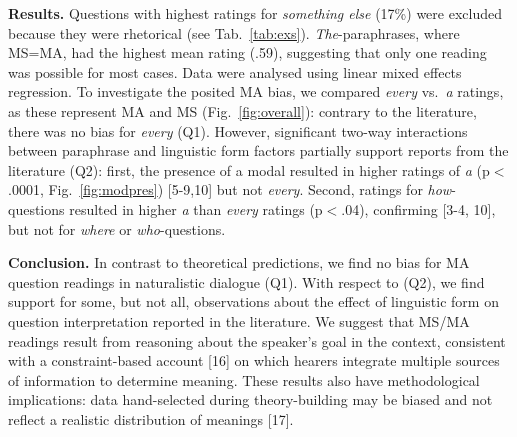 \textbf{Results.} Questions with highest ratings for \emph{something else} (17\%) were excluded because they were rhetorical (see Tab.~\ref{tab:exs}). \emph{The}-paraphrases, where MS=MA, had the highest mean rating (.59), suggesting that only one reading was possible for most cases. Data were analysed using linear mixed effects regression. To investigate the posited MA bias, we compared \emph{every} vs.~\emph{a} ratings, as these represent MA and MS (Fig.~\ref{fig:overall}): contrary to the literature, there was no bias for \emph{every} (Q1). However, significant two-way interactions between paraphrase and linguistic form factors 
partially support reports from the literature (Q2): first, the presence of a modal resulted in higher ratings of \emph{a} (p$<$.0001, Fig.~\ref{fig:modpres}) [5-9,10] but not \emph{every}. %
Second, ratings for \emph{how}-questions resulted in higher \emph{a} than \emph{every} ratings (p$<$.04), confirming [3-4, 10], but not for \emph{where} or \emph{who}-questions. %








\textbf{Conclusion.} In contrast to theoretical predictions, we find no bias for MA question readings in naturalistic dialogue (Q1). With respect to (Q2), we find support for some, but not all, observations about the effect of linguistic form on question interpretation reported in the literature. We suggest that MS/MA readings result from reasoning about the speaker's goal in the context, consistent with a constraint-based  account [16] on which hearers integrate multiple sources of information to determine meaning. These results also have methodological implications: data hand-selected during theory-building may be biased and not reflect a realistic distribution of meanings [17].


